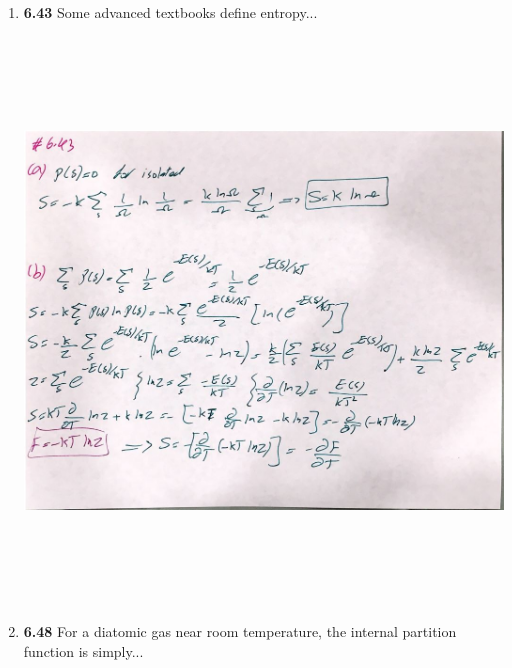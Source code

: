 \documentclass[fleqn]{article}
\begin{document}
\begin{enumerate}
    \pagebreak

    \item \textbf{6.43} Some advanced textbooks define entropy...

      \begin{center}
        \includegraphics[height=15cm, width=16cm]{643.JPG}
      \end{center}

    \pagebreak

    \item \textbf{6.48} For a diatomic gas near room temperature, the internal partition function is simply...  


\end{enumerate}
\end{document}
